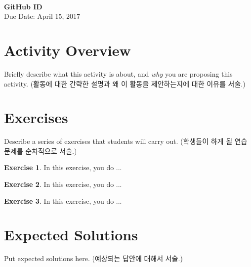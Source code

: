 \documentclass[a4paper, 11pt]{article}
\theoremstyle{definition}
\newtheorem{exercise}{Exercise}
\begin{document}
 \\
         {\phantom{} \hfill \textbf{GitHub ID}} \\
         {\phantom{} \hfill Due Date: April 15, 2017} \\

\section{Activity Overview}

Briefly describe what this activity is about, and \emph{why} you are
proposing this activity. (활동에 대한 간략한 설명과 왜 이 활동을
제안하는지에 대한 이유를 서술.)

\section{Exercises}

Describe a series of exercises that students will carry out. (학생들이 하게
될 연습문제를 순차적으로 서술.)

\begin{exercise}

  In this exercise, you do ...

\end{exercise}

\begin{exercise}

  In this exercise, you do ...

\end{exercise}

\begin{exercise}

  In this exercise, you do ...

\end{exercise}

\section{Expected Solutions}

Put expected solutions here.
(예상되는 답안에 대해서 서술.)



\end{document}
